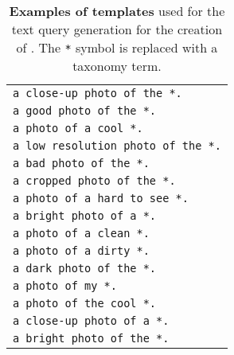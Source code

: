 \begin{table}[t]
    \centering
    \begin{tabular}{l}
        \texttt{a close-up photo of the *.}\\
        \texttt{a good photo of the *.}\\
        \texttt{a photo of a cool *.}\\
        \texttt{a low resolution photo of the *.}\\
        \texttt{a bad photo of the *.}\\
        \texttt{a cropped photo of the *.}\\
        \texttt{a photo of a hard to see *.}\\
        \texttt{a bright photo of a *.}\\
        \texttt{a photo of a clean *.}\\
        \texttt{a photo of a dirty *.}\\
        \texttt{a dark photo of the *.}\\
        \texttt{a photo of my *.}\\
        \texttt{a photo of the cool *.}\\
        \texttt{a close-up photo of a *.}\\
        \texttt{a bright photo of the *.}
    \end{tabular}
    \vspace{-6pt}
    \caption{\textbf{Examples of templates} used for the text query generation for the creation of \miniours. The \texttt{*} symbol is replaced with a taxonomy term.
    \label{tab:templates}
    \vspace{-9pt}
    }
\end{table}

